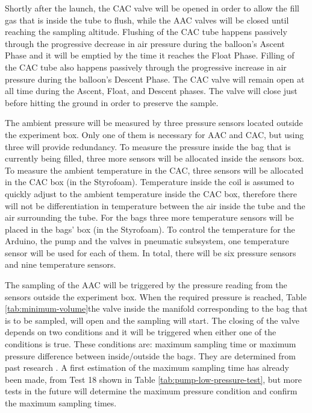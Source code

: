 \documentclass[a4paper,12pt,twoside]{article}
\begin{document}
Shortly after the launch, the CAC valve will be opened in order to allow the fill gas that is inside the tube to flush, while the AAC valves will be closed until reaching the sampling altitude. Flushing of the CAC tube happens passively through the progressive decrease in air pressure during the balloon's Ascent Phase and it will be emptied by the time it reaches the Float Phase. Filling of the CAC tube also happens passively through the progressive increase in air pressure during the balloon's Descent Phase. The CAC valve will remain open at all time during the Ascent, Float, and Descent phases. The valve will close just before hitting the ground in order to preserve the sample. 

The ambient pressure will be measured by three pressure sensors located outside the experiment box. Only one of them is necessary for AAC and CAC, but using three will provide redundancy. To measure the pressure inside the bag that is currently being filled, three more sensors will be allocated inside the sensors box. To measure the ambient temperature in the CAC, three sensors will be allocated in the CAC box (in the Styrofoam). Temperature inside the coil is assumed to quickly adjust to the ambient temperature inside the CAC box, therefore there will not be differentiation in temperature between the air inside the tube and the air surrounding the tube. For the bags three more temperature sensors will be placed in the bags' box (in the Styrofoam). To control the temperature for the Arduino, the pump and the valves in pneumatic subsystem, one temperature sensor will be used for each of them. In total, there will be six pressure sensors and nine temperature sensors. 

The sampling of the AAC will be triggered by the pressure reading from the sensors outside the experiment box. When the required pressure is reached, Table \ref{tab:minimum-volume}the valve inside the manifold corresponding to the bag that is to be sampled, will open and the sampling will start. The closing of the valve depends on two conditions and it will be triggered when either one of the conditions is true. These conditions are: maximum sampling time or maximum pressure difference between inside/outside the bags. They are determined from past research \cite{LISA}. A first estimation of the maximum sampling time has already been made, from Test 18 shown in Table \ref{tab:pump-low-pressure-test}, but more tests in the future will determine the maximum pressure condition and confirm the maximum sampling times.
\end{document}
